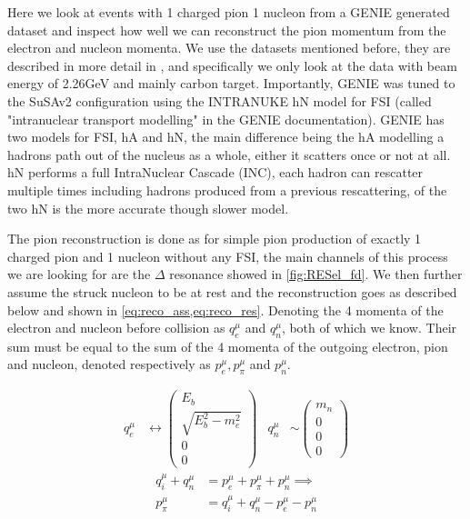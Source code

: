 \documentclass[a4paper,12pt]{article}
\begin{document}
Here we look at events with 1 charged pion 1 nucleon from a GENIE generated dataset and inspect how well we can reconstruct the pion momentum from the electron and nucleon momenta.
We use the datasets mentioned before, they are described in more detail in \cite{papadopoulouLeptonNucleusScatteringMeasurements2023}, and specifically we only look at the data with beam energy of 2.26\si{GeV} and mainly carbon target.
Importantly, GENIE was tuned to the SuSAv2 configuration using the INTRANUKE hN model for FSI (called "intranuclear transport modelling" in the GENIE documentation\cite{andreopoulosGENIENeutrinoMonte2015}).
GENIE has two models for FSI, hA and hN, the main difference being the hA modelling a hadrons path out of the nucleus as a whole, either it scatters once or not at all.
hN performs a full IntraNuclear Cascade (INC), each hadron can rescatter multiple times including hadrons produced from a previous rescattering, of the two hN is the more accurate though slower model\cite{andreopoulosGENIENeutrinoMonte2015}.

The pion reconstruction is done as for simple pion production of exactly 1 charged pion and 1 nucleon without any FSI, the main channels of this process we are looking for are the $\Delta$ resonance showed in \cref{fig:RESel_fd}.
We then further assume the struck nucleon to be at rest and the reconstruction goes as described below and shown in \cref{eq:reco_ass,eq:reco_res}.
Denoting the 4 momenta of the electron and nucleon before collision as $q_e^\mu$ and $q_n^\mu$, both of which we know.
Their sum must be equal to the sum of the 4 momenta of the outgoing electron, pion and nucleon, denoted respectively as $p_e^\mu, p_\pi^\mu$ and $p_n^\mu$.

\begin{align}\label{eq:reco_ass}
    q_e^\mu &\leftrightarrow \begin{pmatrix} E_b \\ \sqrt{E_b^2 - m_e^2} \\ 0 \\ 0 \end{pmatrix} &
    q_n^\mu &\sim \begin{pmatrix} m_n \\ 0 \\ 0 \\ 0 \end{pmatrix}
\end{align}
\begin{align}\label{eq:reco_res}
    q_i^\mu + q_n^\mu &= p_e^\mu + p_\pi^\mu + p_n^\mu \implies \nonumber \\
    p_\pi^\mu &= q_i^\mu + q_n^\mu - p_e^\mu - p_n^\mu
\end{align}
\end{document}
